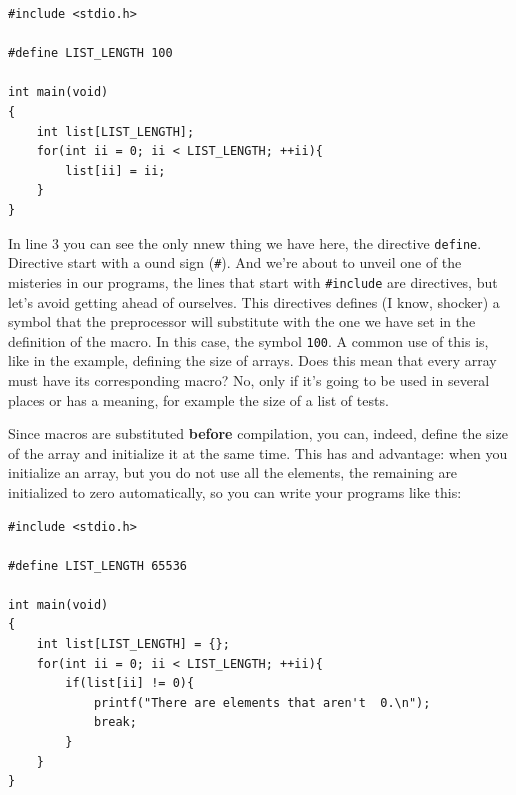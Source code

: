 \documentclass[a4paper]{article}
\begin{document}
\noindent
\begin{minipage}[H]{\linewidth}
\mbox{}
\begin{lstlisting}[style=C,
caption={Macro creation},
label={lst:defineDirective}]
#include <stdio.h>

#define LIST_LENGTH 100

int main(void)
{
    int list[LIST_LENGTH];
    for(int ii = 0; ii < LIST_LENGTH; ++ii){
        list[ii] = ii;
    }
}
\end{lstlisting}
\end{minipage}

In line 3 you can see the only nnew thing we have here, the directive
\verb!define!. Directive start with a ound sign (\verb!#!). And we're about to
unveil one of the misteries in our programs, the lines that start with
\verb!#include! are directives, but let's avoid getting ahead of ourselves.
This directives defines (I know, shocker) a symbol that the preprocessor will
substitute with the one we have set in the definition of the macro. In this
case, the symbol \verb"100". A common use of this is, like in the example,
defining the size of arrays. Does this mean that every array must have its
corresponding macro? No, only if it's going to be used in several places or has
a meaning, for example the size of a list of tests.

Since macros are substituted \textbf{before} compilation, you can, indeed,
define the size of the array and initialize it at the same time. This has and
advantage: when you initialize an array, but you do not use all the elements,
the remaining are initialized to zero automatically, so you can write your
programs like this:

\noindent
\begin{minipage}[H]{\linewidth}
\mbox{}
\begin{lstlisting}[style=C,
caption={Macro use with arrays},
label={lst:defineArray}]
#include <stdio.h>

#define LIST_LENGTH 65536

int main(void)
{
    int list[LIST_LENGTH] = {};
    for(int ii = 0; ii < LIST_LENGTH; ++ii){
        if(list[ii] != 0){
            printf("There are elements that aren't  0.\n");
            break;
        }
    }
}
\end{lstlisting}
\end{minipage}
\end{document}
